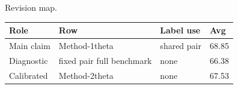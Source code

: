 Revision map.
\begin{tabular}{llll}
Role & Row & Label use & Avg \\
\midrule
Main claim & Method-1theta & shared pair & 68.85 \\
Diagnostic & fixed pair full benchmark & none & 66.38 \\
Calibrated & Method-2theta & none & 67.53 \\
\end{tabular}
